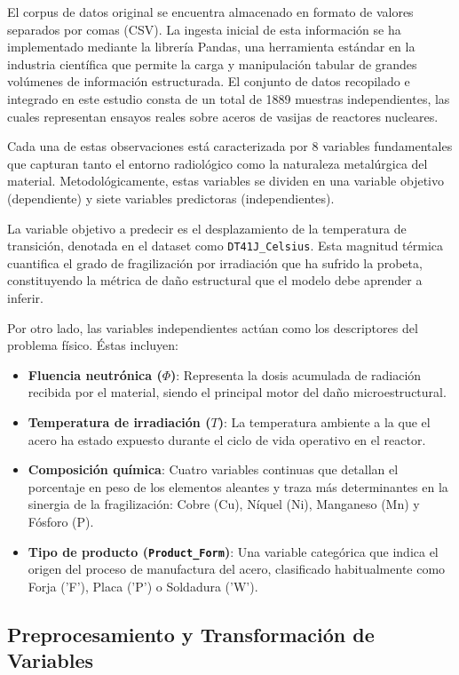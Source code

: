 \documentclass[a4paper, 12pt, twocolumn]{book}
\begin{document}
El corpus de datos original se encuentra almacenado en formato de valores separados por comas (CSV). La ingesta inicial de esta información se ha implementado mediante la librería Pandas, una herramienta estándar en la industria científica que permite la carga y manipulación tabular de grandes volúmenes de información estructurada. El conjunto de datos recopilado e integrado en este estudio consta de un total de 1889 muestras independientes, las cuales representan ensayos reales sobre aceros de vasijas de reactores nucleares. 

Cada una de estas observaciones está caracterizada por 8 variables fundamentales que capturan tanto el entorno radiológico como la naturaleza metalúrgica del material. Metodológicamente, estas variables se dividen en una variable objetivo (dependiente) y siete variables predictoras (independientes). 

La variable objetivo a predecir es el desplazamiento de la temperatura de transición, denotada en el dataset como \texttt{DT41J\_Celsius}. Esta magnitud térmica cuantifica el grado de fragilización por irradiación que ha sufrido la probeta, constituyendo la métrica de daño estructural que el modelo debe aprender a inferir.

Por otro lado, las variables independientes actúan como los descriptores del problema físico. Éstas incluyen:
\begin{itemize}
    \item \textbf{Fluencia neutrónica ($\Phi$)}: Representa la dosis acumulada de radiación recibida por el material, siendo el principal motor del daño microestructural.
    \item \textbf{Temperatura de irradiación ($T$)}: La temperatura ambiente a la que el acero ha estado expuesto durante el ciclo de vida operativo en el reactor.
    \item \textbf{Composición química}: Cuatro variables continuas que detallan el porcentaje en peso de los elementos aleantes y traza más determinantes en la sinergia de la fragilización: Cobre (Cu), Níquel (Ni), Manganeso (Mn) y Fósforo (P).
    \item \textbf{Tipo de producto (\texttt{Product\_Form})}: Una variable categórica que indica el origen del proceso de manufactura del acero, clasificado habitualmente como Forja ('F'), Placa ('P') o Soldadura ('W').
\end{itemize}

\subsection{Preprocesamiento y Transformación de Variables}
\end{document}

